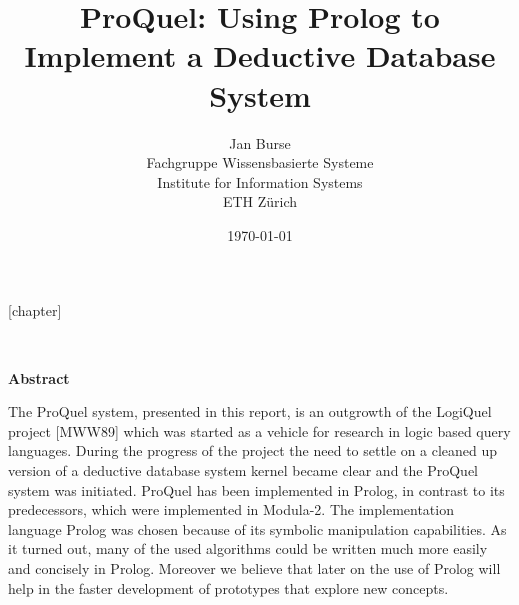 \setlanguage{\english}

\topmargin 0cm
\headheight 0cm
\headsep 0cm
\footheight 1.0cm
\oddsidemargin 0.7cm
\evensidemargin 0cm
\textwidth 15cm
\textheight 22.5cm

\title{ProQuel: Using Prolog to Implement a Deductive Database System}
\author{Jan Burse \\
Fachgruppe Wissensbasierte Systeme \\
Institute for Information Systems \\
ETH Z\"urich}
\date{\today}


\newcommand{\fol}{\;\mid\mid\!\!\!-\;}

[chapter]
\renewcommand{\thedef}{\thechapter.\arabic{def}}
\renewcommand{\newtheorem}[2]{\newenvironment{#1}{\refstepcounter{def}{\bf #2 \thedef:}\em}{}}

\renewenvironment{itemize}{\begin{list}{$\bullet$}{\topsep0.0cm 
\partopsep0.0cm \itemsep0.0cm \parsep1ex}}{\end{list}}

\renewcommand{\theenum}{\roman{enum}}
\renewenvironment{enumerate}{\begin{list}{\theenum)}{\usecounter{enum}\topsep0.0cm 
\partopsep0.0cm \itemsep0.0cm \parsep1ex}}{\end{list}}

\newtheorem{Def}{Definition}
\newtheorem{Lem}{Lemma}
\newtheorem{Pro}{Proposition}
\newtheorem{Bsp}{Example}



\pagestyle{plain}
\setcounter{page}{3}

\ 
\vspace{4cm}

\begin{center}{\bf Abstract}\end{center}

The ProQuel system, presented in this report, is an outgrowth of the LogiQuel project [MWW89]
which was started as a vehicle for research in logic based query languages. During the progress 
of the project the need to settle on a cleaned up version of a deductive database system kernel 
became clear and the ProQuel system was initiated. ProQuel has been implemented in Prolog, in 
contrast to its predecessors, which were implemented in Modula-2. The implementation language 
Prolog was chosen because of its symbolic manipulation capabilities. As it turned out, many of 
the used algorithms could be written much more easily and concisely in Prolog. Moreover we 
believe that later on the use of Prolog will help in the faster development of prototypes that 
explore new concepts. 

